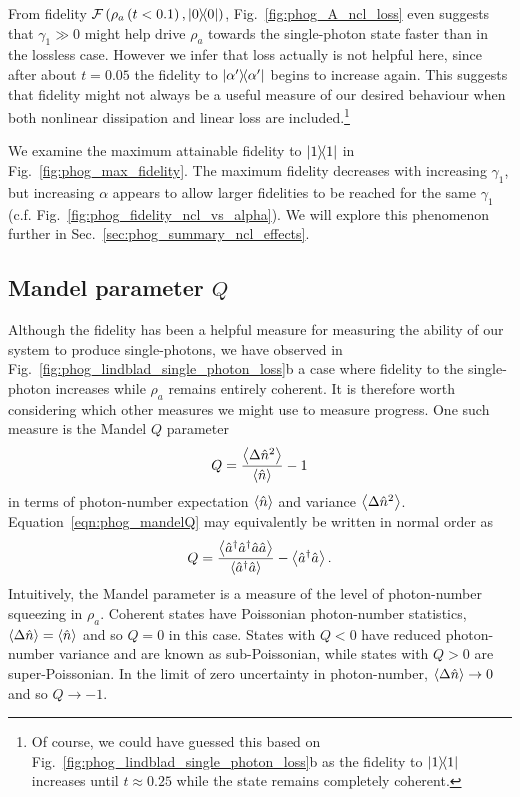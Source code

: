 From fidelity $\mathcal{F}\left( \rho_a\left(t<0.1\right), \dyad{0}\right)$, Fig.~\ref{fig:phog_A_ncl_loss} even suggests that $\gamma_1 \gg 0$ might help drive $\rho_a$ towards the single-photon state faster than in the lossless case. However we infer that loss actually is not helpful here, since after about $t=0.05$ the fidelity to $\dyad{\alpha^\prime}$ begins to increase again. This suggests that fidelity might not always be a useful measure of our desired behaviour when both nonlinear dissipation and linear loss are included.\footnote{Of course, we could have guessed this based on Fig.~\ref{fig:phog_lindblad_single_photon_loss}b as the fidelity to $\dyad{1}$ increases until $t\approx 0.25$ while the state remains completely coherent.}

We examine the maximum attainable fidelity to $\dyad{1}$ in Fig.~\ref{fig:phog_max_fidelity}. The maximum fidelity decreases with increasing $\gamma_1$, but increasing $\alpha$ appears to allow larger fidelities to be reached for the same $\gamma_1$ (c.f. Fig.~\ref{fig:phog_fidelity_ncl_vs_alpha}). We will explore this phenomenon further in Sec.~\ref{sec:phog_summary_ncl_effects}.



\clearpage
\subsection{Mandel parameter $Q$}
Although the fidelity has been a helpful measure for measuring the ability of our system to produce single-photons, we have observed in Fig.~\ref{fig:phog_lindblad_single_photon_loss}b a case where fidelity to the single-photon increases while $\rho_a$ remains entirely coherent. It is therefore worth considering which other measures we might use to measure progress. One such measure is the Mandel $Q$ parameter \cite{Mandel1979, Carmichael1999, Davidovich1996}
\begin{equation}\label{eqn:phog_mandelQ}
Q = \frac{\ev{\Delta\hat{n}^2}}{\ev{\hat{n}}} - 1
\end{equation}
in terms of photon-number expectation $\ev{\hat{n}}$ and variance $\ev{\Delta\hat{n}^2}$. Equation~\ref{eqn:phog_mandelQ} may equivalently be written in normal order as 
\begin{equation}
Q = \frac{\ev{\hat{a}^\dagger \hat{a}^\dagger \hat{a}\hat{a}}}{\ev{\hat{a}^\dagger \hat{a}}} - \ev{\hat{a}^\dagger \hat{a}}.
\end{equation}
Intuitively, the Mandel parameter is a measure of the level of photon-number squeezing in $\rho_a$. Coherent states have Poissonian photon-number statistics, $\ev{\Delta\hat{n}} = \ev{\hat{n}}$ and so $Q = 0$ in this case. States with $Q < 0$ have reduced photon-number variance and are known as sub-Poissonian, while states with $Q > 0$ are super-Poissonian. In the limit of zero uncertainty in photon-number, $\ev{\Delta\hat{n}} \rightarrow 0$ and so $Q \rightarrow -1$. 

